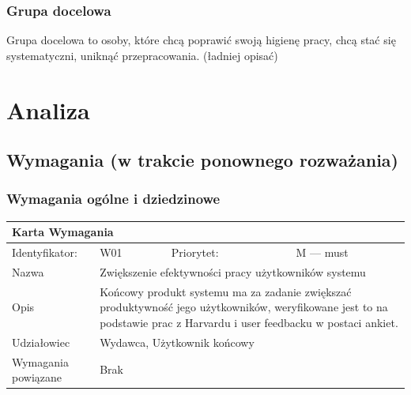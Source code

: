 \documentclass[a4paper,11pt]{report}
\begin{document}
\subsection {Grupa docelowa}
Grupa docelowa to osoby, które chcą poprawić swoją higienę pracy, chcą stać się systematyczni, uniknąć przepracowania. (ładniej opisać)
\chapter {Analiza}

\section {Wymagania (w trakcie ponownego rozważania)}
\subsection {Wymagania ogólne i dziedzinowe}
		\begin{tabular}{|p{3cm}|p{2cm}|p{2cm}|p{6cm}|}
		\hline
		\multicolumn{4}{|p{12 cm}|}{Karta Wymagania}\\
		\hline
		Identyfikator: & W01 & Priorytet: & M — must\\
		\hline
		Nazwa & \multicolumn{3}{|p{10 cm}|}{Zwiększenie efektywności pracy użytkowników systemu}\\
		\hline
		Opis & \multicolumn{3}{|p{10 cm}|}{Końcowy produkt systemu ma za zadanie zwiększać produktywność jego użytkowników, weryfikowane jest to na podstawie prac z Harvardu i user feedbacku w postaci ankiet.}\\
		\hline
		Udziałowiec & \multicolumn{3}{|p{10 cm}|}{Wydawca, Użytkownik końcowy}\\
		\hline
		Wymagania powiązane & \multicolumn{3}{|p{10 cm}|}{Brak}\\
		\hline
		\end{tabular}\\
\end{document}
